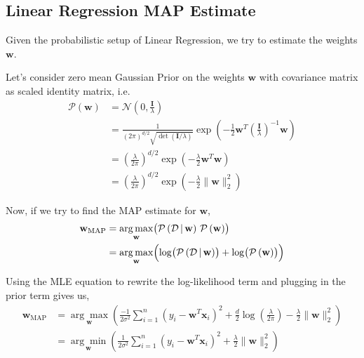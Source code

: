\documentclass{report}
\newcommand{\w}{\mathbf{w}} %
\newcommand{\x}{\mathbf{x}}
\newcommand\norm[1]{\lVert#1\rVert}
\begin{document}
\subsection{Linear Regression MAP Estimate}

Given the probabilistic setup of Linear Regression, we try to estimate the weights $\w$.

Let's consider zero mean Gaussian Prior on the weights $\w$ with covariance matrix as scaled identity matrix, i.e.
\begin{align*}
  \mathcal{P}\left(\w\right) & = \mathcal{N}\left(0,\frac{\mathbf{I}}{\lambda}\right)                                                                                    \\
                             & = \frac{1}{(2\pi)^{d/2}\sqrt{\det(\mathbf{I}/\lambda)}} \exp{\left(-\frac{1}{2}\w^T\left(\frac{\mathbf{I}}{\lambda}\right)^{-1}\w\right)} \\
                             & = \left(\frac{\lambda}{2\pi}\right)^{d/2} \exp{\left(-\frac{\lambda}{2}\w^T\w\right)}                                                     \\
                             & = \left(\frac{\lambda}{2\pi}\right)^{d/2} \exp{\left(-\frac{\lambda}{2}\norm{\w}_2^2\right)}
\end{align*}

Now, if we try to find the MAP estimate for $\w$,
\begin{align*}
  \w_{\text{MAP}} & = \underset{\w}{\arg\max}
  \bigl(\mathcal{P}\left(\mathcal{D} \, | \, \w\right) \, \mathcal{P}\left(\w\right)\bigr) \\
                  & =\underset{\w}{\arg\max}
  \Bigl(\log\bigl(\mathcal{P}\left(\mathcal{D} \, | \, \w\right)\bigr) + \log\bigl(\mathcal{P}\left(\w\right)\bigr)\Bigr)
\end{align*}

Using the MLE equation to rewrite the log-likelihood term and plugging in the prior term gives us,
\begin{align*}
  \w_{\text{MAP}} & = \underset{\w}{\arg\max}
  \left(\frac{-1}{2\sigma^2} \sum_{i=1}^n \left(y_i - \w^T\x_i\right)^2 + \frac{d}{2}\log\left(\frac{\lambda}{2\pi}\right) - \frac{\lambda}{2}\norm{\w}_2^2\right) \\
                  & = \underset{\w}{\arg\min}
  \left(\frac{1}{2\sigma^2} \sum_{i=1}^n \left(y_i - \w^T\x_i\right)^2 + \frac{\lambda}{2}\norm{\w}_2^2\right)
\end{align*}
\end{document}

